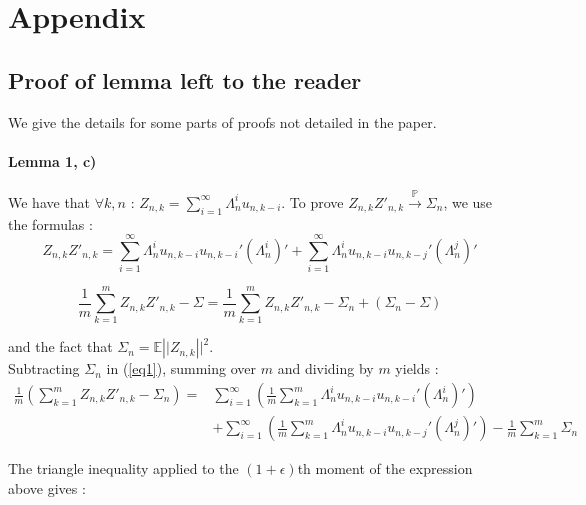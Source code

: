\documentclass[11pt]{article}
\begin{document}
\newpage

\section{Appendix}


\subsection{Proof of lemma left to the reader}
We give the details for some parts of proofs not detailed in the paper.

\paragraph{Lemma 1, c)} We have that $\forall k, n$ : $Z_{n,k} = \sum_{i=1}^\infty \Lambda_n^i u_{n,k-i}$.
To prove $Z_{n,k}Z'_{n,k} \overset{\mathbb{P}}{\to}  \Sigma_n$, we use the formulas :
\begin{equation}\label{eq1}
 Z_{n,k}Z'_{n,k} = \sum^\infty_{i=1} \Lambda_n^i u_{n,k-i}u_{n,k-i}' (\Lambda_n^i)' + \sum^\infty_{i=1}  \Lambda_n^i u_{n,k-i}u_{n,k-j}' (\Lambda_n^j)'
\end{equation}

\begin{equation} \label{eq2}
\frac{1}{m} \sum_{k=1}^m Z_{n,k}Z'_{n,k} - \Sigma = \frac{1}{m} \sum_{k=1}^m Z_{n,k}Z'_{n,k}  - \Sigma_n + \left(\Sigma_n - \Sigma \right)
\end{equation}

and the fact that $\Sigma_n = \mathbb{E}\left||Z_{n,k}\right||^2$. \\

Subtracting $\Sigma_n$ in (\ref{eq1}), summing over $m$ and dividing by $m$ yields :
\begin{equation}
\begin{split}
\frac{1}{m} \left(\sum_{k=1}^m Z_{n,k}Z'_{n,k} - \Sigma_n \right) = & \sum_{i=1}^\infty  \left(\frac{1}{m} \sum_{k=1}^m  \Lambda_n^i u_{n,k-i}u_{n,k-i}' (\Lambda_n^i)' \right) \\
 & + \sum_{i=1}^\infty \left(\frac{1}{m} \sum^m_{k=1}  \Lambda_n^i u_{n,k-i}u_{n,k-j}' (\Lambda_n^j)'\right) - \frac{1}{m} \sum^m_{k=1}  \Sigma_n
\end{split}
\end{equation}

The triangle inequality applied to the $(1+\epsilon)$th moment of the expression above gives :
\end{document}
